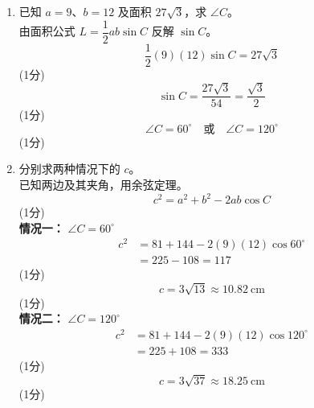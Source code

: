 \documentclass[12pt,a4paper]{exam-zh}
\begin{document}
\begin{solution}
    \begin{enumerate}[label=(\alph*)]
        \item 已知 $a = 9$、$b = 12$ 及面积 $27\sqrt{3}$，求 $\angle C$。 \\
        由面积公式 $L = \dfrac{1}{2}ab\sin C$ 反解 $\sin C$。 \\
        \[
            \frac{1}{2}(9)(12)\sin C = 27\sqrt{3}
        \]
        \hfill (1分) \\
        \[
            \sin C = \frac{27\sqrt{3}}{54} = \frac{\sqrt{3}}{2}
        \]
        \hfill (1分) \\
        \[
            \angle C = 60^\circ \quad \text{或} \quad \angle C = 120^\circ
        \]
        \hfill (1分)

        \item 分别求两种情况下的 $c$。 \\
        已知两边及其夹角，用余弦定理。 \\
        \[
            c^2 = a^2 + b^2 - 2ab\cos C
        \]
        \hfill (1分) \\
        \textbf{情况一：} $\angle C = 60^\circ$
        \begin{align*}
            c^2 &= 81 + 144 - 2(9)(12)\cos 60^\circ \\
                &= 225 - 108 = 117
        \end{align*}
        \hfill (1分) \\
        \[
            c = 3\sqrt{13} \approx 10.82 \ \mathrm{cm}
        \]
        \hfill (1分) \\
        \textbf{情况二：} $\angle C = 120^\circ$
        \begin{align*}
            c^2 &= 81 + 144 - 2(9)(12)\cos 120^\circ \\
                &= 225 + 108 = 333
        \end{align*}
        \hfill (1分) \\
        \[
            c = 3\sqrt{37} \approx 18.25 \ \mathrm{cm}
        \]
        \hfill (1分)
    \end{enumerate}
\end{solution}
\end{document}
